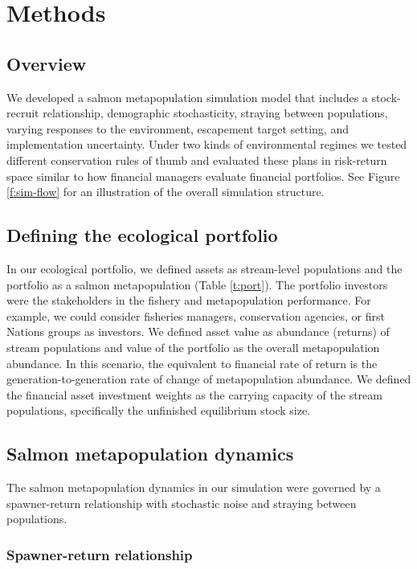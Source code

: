 \section{Methods}

\subsection{Overview}

We developed a salmon metapopulation simulation model that includes a
stock-recruit relationship, demographic stochasticity, straying between
populations, varying responses to the environment, escapement target
setting, and implementation uncertainty. Under two kinds of
environmental regimes we tested different conservation rules of thumb
and evaluated these plans in risk-return space similar to how financial
managers evaluate financial portfolios. See Figure \ref{f:sim-flow} for
an illustration of the overall simulation structure.

\subsection{Defining the ecological portfolio}

In our ecological portfolio, we defined assets as stream-level
populations and the portfolio as a salmon metapopulation (Table
\ref{t:port}). The portfolio investors were the stakeholders in the
fishery and metapopulation performance. For example, we could consider
fisheries managers, conservation agencies, or first Nations groups as
investors. We defined asset value as abundance (returns) of stream
populations and value of the portfolio as the overall metapopulation
abundance. In this scenario, the equivalent to financial rate of return
is the generation-to-generation rate of change of metapopulation
abundance. We defined the financial asset investment weights as the
carrying capacity of the stream populations, specifically the unfinished
equilibrium stock size.

\subsection{Salmon metapopulation dynamics}

The salmon metapopulation dynamics in our simulation were governed by a
spawner-return relationship with stochastic noise and straying between
populations.

\subsubsection{Spawner-return relationship}

